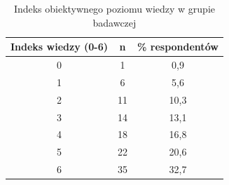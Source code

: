 

\begin{table}[H]
    \centering
    \caption{Indeks obiektywnego poziomu wiedzy w grupie badawczej}
    \label{tab:indeks-wiedzy}
    \begin{tabular}{|c|c|c|}
        \hline
        \textbf{Indeks wiedzy (0-6)} & \textbf{n} & \textbf{\% respondentów} \\
        \hline
        \hline
        0 & 1 & 0,9 \\
        \hline
        1 & 6 & 5,6 \\
        \hline
        2 & 11 & 10,3 \\
        \hline
        3 & 14 & 13,1 \\
        \hline
        4 & 18 & 16,8 \\
        \hline
        5 & 22 & 20,6 \\
        \hline
        6 & 35 & 32,7 \\
        \hline
    \end{tabular}
\end{table}

